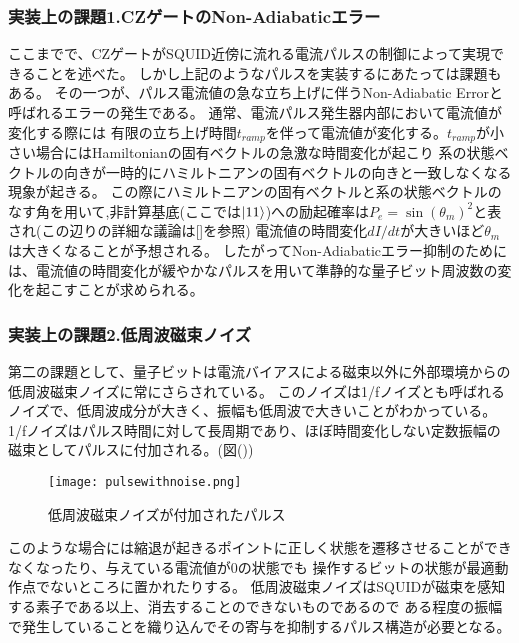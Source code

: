         \subsubsection{実装上の課題1.CZゲートのNon-Adiabaticエラー}
        ここまでで、CZゲートがSQUID近傍に流れる電流パルスの制御によって実現できることを述べた。
        しかし上記のようなパルスを実装するにあたっては課題もある。
        その一つが、パルス電流値の急な立ち上げに伴うNon-Adiabatic Errorと呼ばれるエラーの発生である。
        通常、電流パルス発生器内部において電流値が変化する際には
        有限の立ち上げ時間$t_{ramp}$を伴って電流値が変化する。$t_{ramp}$が小さい場合にはHamiltonianの固有ベクトルの急激な時間変化が起こり
        系の状態ベクトルの向きが一時的にハミルトニアンの固有ベクトルの向きと一致しなくなる現象が起きる。
        この際にハミルトニアンの固有ベクトルと系の状態ベクトルのなす角を用いて,非計算基底(ここでは$\ket{11}$)への励起確率は$P_{e}= {\sin(\theta_m)}^2$と表され(この辺りの詳細な議論は[]を参照)
        電流値の時間変化$dI/dt$が大きいほど$\theta_m$は大きくなることが予想される。
        したがってNon-Adiabaticエラー抑制のためには、電流値の時間変化が緩やかなパルスを用いて準静的な量子ビット周波数の変化を起こすことが求められる。

        \subsubsection{実装上の課題2.低周波磁束ノイズ}
        第二の課題として、量子ビットは電流バイアスによる磁束以外に外部環境からの低周波磁束ノイズに常にさらされている。
        このノイズは1/fノイズとも呼ばれるノイズで、低周波成分が大きく、振幅も低周波で大きいことがわかっている。
        1/fノイズはパルス時間に対して長周期であり、ほぼ時間変化しない定数振幅の磁束としてパルスに付加される。(図())
        \begin{figure}[H]
            \begin{center}
                \texttt{[image: pulsewithnoise.png]}
                \caption{低周波磁束ノイズが付加されたパルス}
            \end{center}
        \end{figure}
        このような場合には縮退が起きるポイントに正しく状態を遷移させることができなくなったり、与えている電流値が0の状態でも
        操作するビットの状態が最適動作点でないところに置かれたりする。
        低周波磁束ノイズはSQUIDが磁束を感知する素子である以上、消去することのできないものであるので
        ある程度の振幅で発生していることを織り込んでその寄与を抑制するパルス構造が必要となる。

